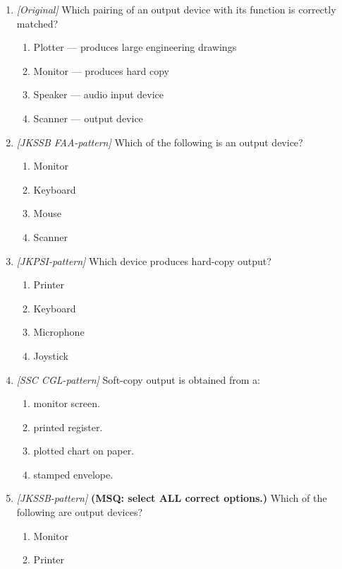 \begin{enumerate}[label=\textbf{Q\arabic*.}, leftmargin=*]
\begin{enumerate}[label=\Alph*.]
    \item projector.
  \end{enumerate}
\item \textit{[Original]} Which pairing of an output device with its function
  is correctly matched?
  \begin{enumerate}[label=\Alph*.]
    \item Plotter --- produces large engineering drawings
    \item Monitor --- produces hard copy
    \item Speaker --- audio input device
    \item Scanner --- output device
  \end{enumerate}

\item \textit{[JKSSB FAA-pattern]} Which of the following is an output device?
  \begin{enumerate}[label=\Alph*.]
    \item Monitor
    \item Keyboard
    \item Mouse
    \item Scanner
  \end{enumerate}
\item \textit{[JKPSI-pattern]} Which device produces hard-copy output?
  \begin{enumerate}[label=\Alph*.]
    \item Printer
    \item Keyboard
    \item Microphone
    \item Joystick
  \end{enumerate}
\item \textit{[SSC CGL-pattern]} Soft-copy output is obtained from a:
  \begin{enumerate}[label=\Alph*.]
    \item monitor screen.
    \item printed register.
    \item plotted chart on paper.
    \item stamped envelope.
  \end{enumerate}
\item \textit{[JKSSB-pattern]} \textbf{(MSQ: select ALL correct options.)} Which of the following are output devices?
  \begin{enumerate}[label=\Alph*.]
    \item Monitor
    \item Printer

\end{enumerate}
\end{enumerate}
